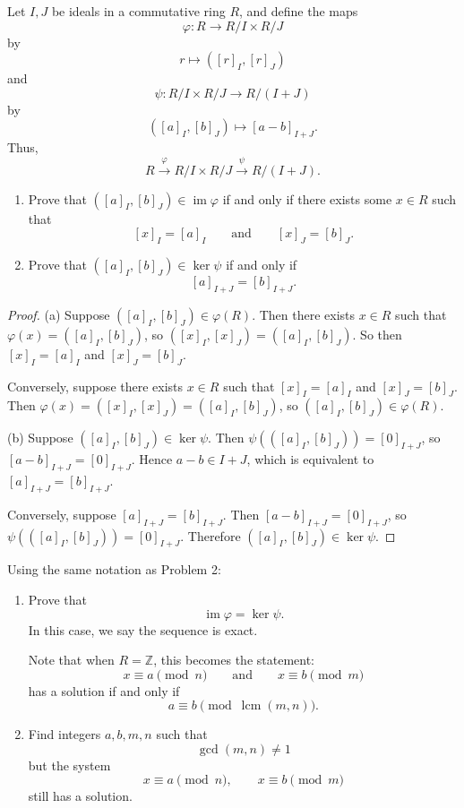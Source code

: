 \documentclass[addpoints,10pt]{exam}
\theoremstyle{plain}
\theoremstyle{definition}
\newtheorem{prob}[thm]{Problem}
\theoremstyle{plain}
\theoremstyle{definition}
\let\oldprob\prob
\let\endoldprob\endprob
\renewenvironment{prob}
  {\begin{singlespace}\oldprob}
  {\endoldprob\end{singlespace}}
\newcommand{\ZZ}{\ensuremath{\mathbb{Z}}}
\begin{document}
\newpage
\begin{prob}
Let $I,J$ be ideals in a commutative ring $R$, and define the maps
\[
\varphi:R\to R/I\times R/J
\]
by
\[
r\mapsto ([r]_I,[r]_J)
\]
and
\[
\psi:R/I\times R/J\to R/(I+J)
\]
by
\[
([a]_I,[b]_J)\mapsto [a-b]_{I+J}.
\]
Thus,
\[
R\xrightarrow{\varphi}R/I\times R/J\xrightarrow{\psi}R/(I+J).
\]

\begin{enumerate}[label=(\alph*)]
\item Prove that $([a]_I,[b]_J)\in \operatorname{im}\varphi$ if and only if there exists some $x\in R$ such that
\[
[x]_I=[a]_I \qquad \text{and} \qquad [x]_J=[b]_J.
\]

\item Prove that $([a]_I,[b]_J)\in \ker\psi$ if and only if
\[
[a]_{I+J}=[b]_{I+J}.
\]
\end{enumerate}
\end{prob}

\begin{proof}
(a)
Suppose
$([a]_I,[b]_J)\in\varphi(R)$.
Then there exists $x\in R$ such that
$\varphi(x)=([a]_I,[b]_J)$, so
$([x]_I,[x]_J)=([a]_I,[b]_J)$.
So then
$[x]_I=[a]_I$
and
$[x]_J=[b]_J$.

Conversely, suppose there exists $x\in R$ such that
$[x]_I=[a]_I$
and
$[x]_J=[b]_J$.
Then
$\varphi(x)=([x]_I,[x]_J)=([a]_I,[b]_J)$,
so
$([a]_I,[b]_J)\in\varphi(R)$.

(b)
Suppose
$([a]_I,[b]_J)\in\ker\psi$.
Then
$\psi(([a]_I,[b]_J))=[0]_{I+J}$,
so
$[a-b]_{I+J}=[0]_{I+J}$.
Hence
$a-b\in I+J$,
which is equivalent to
$[a]_{I+J}=[b]_{I+J}$.

Conversely, suppose
$[a]_{I+J}=[b]_{I+J}$.
Then
$[a-b]_{I+J}=[0]_{I+J}$,
so
$\psi(([a]_I,[b]_J))=[0]_{I+J}$.
Therefore
$([a]_I,[b]_J)\in\ker\psi$.

\end{proof}

\newpage
\begin{prob}
Using the same notation as Problem 2:

\begin{enumerate}[label=(\alph*)]
\item Prove that
\[
\operatorname{im}\varphi=\ker\psi.
\]
In this case, we say the sequence is exact.

Note that when $R=\ZZ$, this becomes the statement:
\[
x\equiv a \pmod n
\qquad \text{and} \qquad
x\equiv b \pmod m
\]
has a solution if and only if
\[
a\equiv b \pmod{\operatorname{lcm}(m,n)}.
\]

\item Find integers $a,b,m,n$ such that
\[
\gcd(m,n)\neq 1
\]
but the system
\[
x\equiv a \pmod n,
\qquad
x\equiv b \pmod m
\]
still has a solution.
\end{enumerate}
\end{prob}
\end{document}
